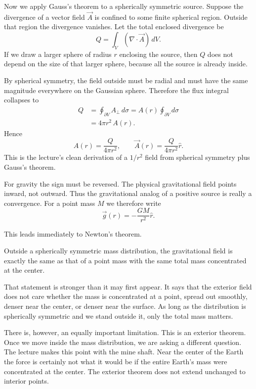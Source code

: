 Now we apply Gauss's theorem to a spherically symmetric source. Suppose the divergence of a vector field \(\vec A\) is confined to some finite spherical region. Outside that region the divergence vanishes. Let the total enclosed divergence be
\begin{equation}
Q=\int_V (\nabla\cdot\vec A)\,dV.
\end{equation}
If we draw a larger sphere of radius \(r\) enclosing the source, then \(Q\) does not depend on the size of that larger sphere, because all the source is already inside.

By spherical symmetry, the field outside must be radial and must have the same magnitude everywhere on the Gaussian sphere. Therefore the flux integral collapses to
\begin{align}
Q
&=
\oint_{\partial V} A_\perp\,d\sigma
=
A(r)\oint_{\partial V} d\sigma \\
&= 4\pi r^2\,A(r).
\end{align}
Hence
\begin{equation}
A(r)=\frac{Q}{4\pi r^2},
\qquad
\vec A(r)=\frac{Q}{4\pi r^2}\hat r.
\end{equation}
This is the lecture's clean derivation of a \(1/r^2\) field from spherical symmetry plus Gauss's theorem.

For gravity the sign must be reversed. The physical gravitational field points inward, not outward. Thus the gravitational analog of a positive source is really a convergence. For a point mass \(M\) we therefore write
\begin{equation}
\vec g(r)=-\frac{GM}{r^2}\hat r.
\end{equation}

This leads immediately to Newton's theorem.

\begin{proposition}
Outside a spherically symmetric mass distribution, the gravitational field is exactly the same as that of a point mass with the same total mass concentrated at the center.
\end{proposition}

That statement is stronger than it may first appear. It says that the exterior field does not care whether the mass is concentrated at a point, spread out smoothly, denser near the center, or denser near the surface. As long as the distribution is spherically symmetric and we stand outside it, only the total mass matters.

There is, however, an equally important limitation. This is an exterior theorem. Once we move inside the mass distribution, we are asking a different question. The lecture makes this point with the mine shaft. Near the center of the Earth the force is certainly not what it would be if the entire Earth's mass were concentrated at the center. The exterior theorem does not extend unchanged to interior points.

